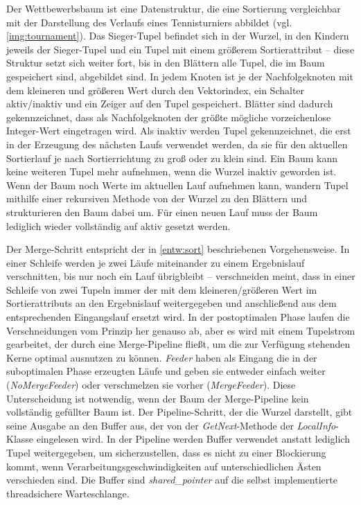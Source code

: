 \documentclass[a4paper,12pt,twoside]{article}
\newcommand{\Fb}[1]{\textit{#1}} %
\begin{document}
Der Wettbewerbsbaum ist eine Datenstruktur, die eine Sortierung vergleichbar mit der Darstellung des Verlaufs eines Tennisturniers abbildet (vgl. \autoref{img:tournament}). Das Sieger-Tupel befindet sich in der Wurzel, in den Kindern jeweils der Sieger-Tupel und ein Tupel mit einem größerem Sortierattribut -- diese Struktur setzt sich weiter fort, bis in den Blättern alle Tupel, die im Baum gespeichert sind, abgebildet sind. In jedem Knoten ist je der Nachfolgeknoten mit dem kleineren und größeren Wert durch den Vektorindex, ein Schalter aktiv/inaktiv und ein Zeiger auf den Tupel gespeichert. Blätter sind dadurch gekennzeichnet, dass als Nachfolgeknoten der größte mögliche vorzeichenlose Integer-Wert eingetragen wird. Als inaktiv werden Tupel gekennzeichnet, die erst in der Erzeugung des nächsten Laufs verwendet werden, da sie für den aktuellen Sortierlauf je nach Sortierrichtung zu groß oder zu klein sind. Ein Baum kann keine weiteren Tupel mehr aufnehmen, wenn die Wurzel inaktiv geworden ist. Wenn der Baum noch Werte im aktuellen Lauf aufnehmen kann, wandern Tupel mithilfe einer rekursiven Methode von der Wurzel zu den Blättern und strukturieren den Baum dabei um. Für einen neuen Lauf muss der Baum lediglich wieder vollständig auf aktiv gesetzt werden. 

Der Merge-Schritt entspricht der in \autoref{entw:sort} beschriebenen Vorgehensweise. In einer Schleife werden je zwei Läufe miteinander zu einem Ergebnislauf verschnitten, bis nur noch ein Lauf übrigbleibt -- verschneiden meint, dass in einer Schleife von zwei Tupeln immer der mit dem kleineren/größeren Wert im Sortierattributs an den Ergebnislauf weitergegeben und anschließend aus dem entsprechenden Eingangslauf ersetzt wird. In der postoptimalen Phase laufen die Verschneidungen vom Prinzip her genauso ab, aber es wird mit einem Tupelstrom gearbeitet, der durch eine Merge-Pipeline fließt, um die zur Verfügung stehenden Kerne optimal ausnutzen zu können. \Fb{Feeder} haben als Eingang die in der suboptimalen Phase erzeugten Läufe und geben sie entweder einfach weiter (\Fb{NoMergeFeeder}) oder verschmelzen sie vorher (\Fb{MergeFeeder}). Diese Unterscheidung ist notwendig, wenn der Baum der Merge-Pipeline kein vollständig gefüllter Baum ist. Der Pipeline-Schritt, der die Wurzel darstellt, gibt seine Ausgabe an den Buffer aus, der von der \Fb{\Fb{GetNext}}-Methode der \Fb{\Fb{LocalInfo}}-Klasse eingelesen wird. In der Pipeline werden Buffer verwendet anstatt lediglich Tupel weitergegeben, um sicherzustellen, dass es nicht zu einer Blockierung kommt, wenn Verarbeitungsgeschwindigkeiten auf unterschiedlichen Ästen verschieden sind. Die Buffer sind \Fb{shared\_pointer} auf die selbst implementierte threadsichere Warteschlange.  
\end{document}
